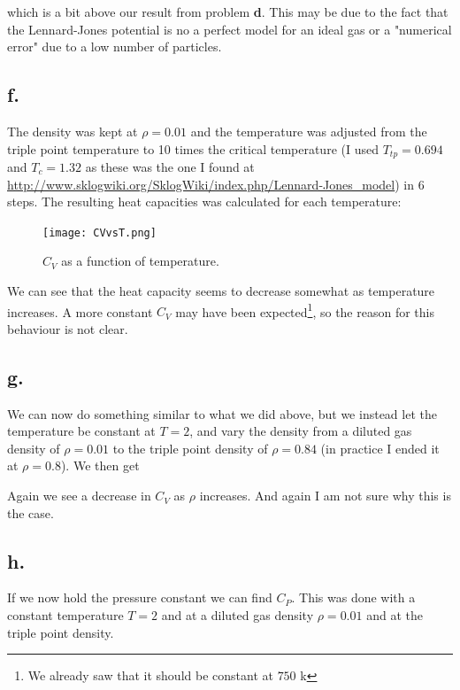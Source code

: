 \documentclass{article}
\begin{document}
which is a bit above our result from problem \textbf{d}. This may be due to the fact that the Lennard-Jones potential is no a perfect model for an ideal gas or a "numerical error" due to a low number of particles.


\subsection*{f.}
The density was kept at $\rho = 0.01$ and the temperature was adjusted from the triple point temperature to 10 times the critical temperature (I used $T_{tp} = 0.694$ and $T_c = 1.32$ as these was the one I found at \url{http://www.sklogwiki.org/SklogWiki/index.php/Lennard-Jones_model}) in 6 steps. The resulting heat capacities was calculated for each temperature:

\begin{figure}[H]
\centering
\texttt{[image: CVvsT.png]}
\caption{$C_V$ as a function of temperature.}
\label{fig:isoTherm}
\end{figure}

We can see that the heat capacity seems to decrease somewhat as temperature increases. A more constant $C_V$ may have been expected\footnote{We already saw that it should be constant at $750$ k}, so the reason for this behaviour is not clear.

\subsection*{g.}

We can now do something similar to what we did above, but we instead let the temperature be constant at $T=2$, and vary the density from a diluted gas density of $\rho = 0.01$ to the triple point density of $\rho = 0.84$ (in practice I ended it at $\rho = 0.8$). We then get


Again we see a decrease in $C_V$ as $\rho$ increases. And again I am not sure why this is the case.

\subsection*{h.}
If we now hold the pressure constant we can find $C_P$. This was done with a constant temperature $T=2$ and at a diluted gas density $\rho = 0.01$ and at the triple point density.
\end{document}
